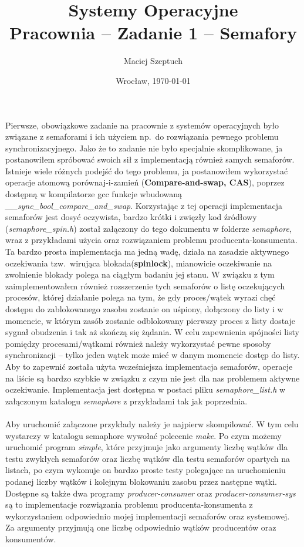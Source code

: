 \documentclass[12pt,leqno]{article}
\title{\LARGE \textbf{{Systemy Operacyjne}}\\
      {\Large Pracownia -- Zadanie 1 -- Semafory}\\
}
\author{Maciej Szeptuch}
\date{Wrocław, \today}
\begin{document}
\thispagestyle{empty}
\maketitle

Pierwsze, obowiązkowe zadanie na pracownie z systemów operacyjnych było związane
z semaforami i ich użyciem np.\ do rozwiązania pewnego problemu synchronizacyjnego.
Jako że to zadanie nie było specjalnie skomplikowane, ja postanowiłem spróbować
swoich sił z implementacją również samych semaforów. Istnieje wiele różnych podejść
do tego problemu, ja postanowiłem wykorzystać operacje atomową porównaj-i-zamień
(\textbf{Compare-and-swap, CAS}), poprzez dostępną w kompilatorze gcc funkcje
wbudowaną \textit{\_\_sync\_bool\_compare\_and\_swap}. Korzystając z tej operacji
implementacja semaforów jest dosyć oczywista, bardzo krótki i zwięzły kod źródłowy
(\textit{semaphore\_spin.h}) został załączony do tego dokumentu w folderze
\textit{semaphore}, wraz z przykładami użycia oraz rozwiązaniem problemu
producenta-konsumenta. \\
Ta bardzo prosta implementacja ma jedną wadę, działa na zasadzie aktywnego oczekiwania
tzw.\ wirująca blokada(\textbf{spinlock}), mianowicie oczekiwanie na zwolnienie
blokady polega na ciągłym badaniu jej stanu. W związku z tym zaimplementowałem również
rozszerzenie tych semaforów o listę oczekujących procesów, której działanie polega
na tym, że gdy proces/wątek wyrazi chęć dostępu do zablokowanego zasobu zostanie
on uśpiony, dołączony do listy i w momencie, w którym zasób zostanie odblokowany
pierwszy proces z listy dostaje sygnał obudzenia i tak aż skończą się żądania.
W celu zapewnienia spójności listy pomiędzy procesami/wątkami również należy
wykorzystać pewne sposoby synchronizacji -- tylko jeden wątek może mieć w danym
momencie dostęp do listy. Aby to zapewnić została użyta wcześniejsza implementacja
semaforów, operacje na liście są bardzo szybkie w związku z czym nie jest dla nas
problemem aktywne oczekiwanie. Implementacja jest dostępna w postaci pliku
\textit{semaphore\_list.h} w załączonym katalogu \textit{semaphore} z przykładami
tak jak poprzednia. \\
\\
Aby uruchomić załączone przykłady należy je najpierw skompilować. W tym celu
wystarczy w katalogu semaphore wywołać polecenie \textit{make}. Po czym możemy
uruchomić program \textit{simple}, które przyjmuje jako argumenty liczbę wątków dla testu
zwykłych semaforów oraz liczbę wątków dla testu semaforów opartych na listach,
po czym wykonuje on bardzo proste testy polegające na uruchomieniu podanej liczby wątków
i kolejnym blokowaniu zasobu przez następne wątki. \\
Dostępne są także dwa programy \textit{producer-consumer} oraz
\textit{producer-consumer-sys} są to implementacje rozwiązania problemu
producenta-konsumenta z wykorzystaniem odpowiednio mojej implementacji semaforów oraz
systemowej. Za argumenty przyjmują one liczbę odpowiednio wątków producentów oraz
konsumentów.
\end{document}
